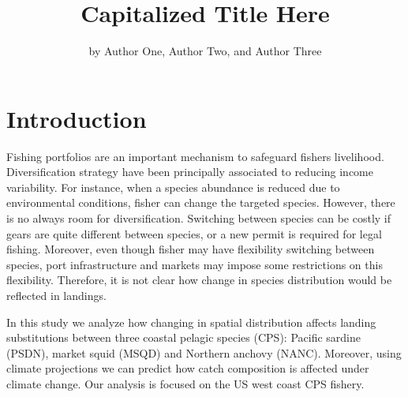 \title{Capitalized Title Here}
\author{by Author One, Author Two, and Author Three}

\maketitle


\hypertarget{introduction}{%
\section{Introduction}\label{introduction}}

Fishing portfolios are an important mechanism to safeguard fishers
livelihood. Diversification strategy have been principally associated to
reducing income variability. For instance, when a species abundance is
reduced due to environmental conditions, fisher can change the targeted
species. However, there is no always room for diversification. Switching
between species can be costly if gears are quite different between
species, or a new permit is required for legal fishing. Moreover, even
though fisher may have flexibility switching between species, port
infrastructure and markets may impose some restrictions on this
flexibility. Therefore, it is not clear how change in species
distribution would be reflected in landings.

In this study we analyze how changing in spatial distribution affects
landing substitutions between three coastal pelagic species (CPS):
Pacific sardine (PSDN), market squid (MSQD) and Northern anchovy (NANC).
Moreover, using climate projections we can predict how catch composition
is affected under climate change. Our analysis is focused on the US west
coast CPS fishery.

